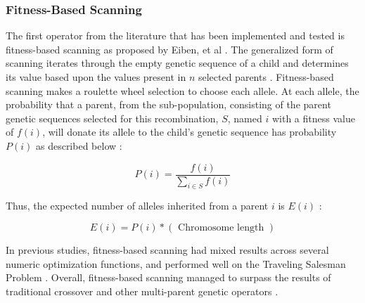 \subsubsection*{Fitness-Based Scanning}
The first operator from the literature that has been implemented and tested is fitness-based scanning as proposed by Eiben, et al \cite{Eiben94}. The generalized form of scanning iterates through the empty genetic sequence of a child and determines its value based upon the values present in $n$ selected parents \cite{Eiben91}. Fitness-based scanning makes a roulette wheel selection to choose each allele. At each allele, the probability that a parent, from the sub-population, consisting of the parent genetic sequences selected for this recombination, $S$, named $i$ with a fitness value of $f(i)$, will donate its allele to the child's genetic sequence has probability $P(i)$ as described below \cite{Eiben94}: 

\[ P(i) = \frac{f(i)}{\sum\limits_{i \in S} f(i)} \]

\noindent Thus, the expected number of alleles inherited from a parent $i$ is $E(i)$ \cite{Eiben94}:

\[ E(i) = P(i) *(\text{ Chromosome length }) \]

In previous studies, fitness-based scanning had mixed results across several numeric optimization functions, and performed well on the Traveling Salesman Problem \cite{Eiben94, Eiben95}. Overall, fitness-based scanning managed to surpass the results of traditional crossover and other multi-parent genetic operators \cite{Eiben94}. 

